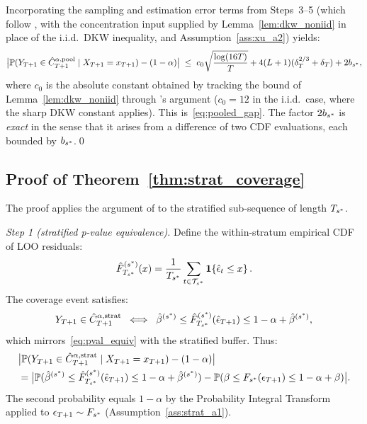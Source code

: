 Incorporating the sampling and estimation error terms
from Steps~3--5 (which follow \citealt[proof of Theorem~1]{xu2023conformal},
with the concentration input supplied by
Lemma~\ref{lem:dkw_noniid} in place of the i.i.d.\ DKW
inequality, and Assumption~\ref{ass:xu_a2}) yields:
\[
  \bigl|\mathbb{P}(Y_{T+1} \in \hat{C}_{T+1}^{\alpha,\text{pool}} \mid X_{T+1}=x_{T+1}) - (1-\alpha)\bigr|
  \;\leq\;
  c_0\sqrt{\frac{\log(16T)}{T}}
  + 4(L+1)(\delta_T^{2/3}+\delta_T)
  + 2b_{s^*},
\]
where $c_0$ is the absolute constant obtained by tracking the
bound of Lemma~\ref{lem:dkw_noniid} through
\citeauthor{xu2023conformal}'s argument ($c_0 = 12$ in the
i.i.d.\ case, where the sharp DKW constant applies).  This
is~\eqref{eq:pooled_gap}. The factor $2b_{s^*}$ is
\emph{exact} in the sense that it arises from a difference of two
CDF evaluations, each bounded by $b_{s^*}$.\qed

\subsection{Proof of Theorem~\ref{thm:strat_coverage}}
\label{app:proofs:thm1s}

The proof applies the argument of
\citet[Theorem~1]{xu2023conformal} to the stratified
sub-sequence of length $T_{s^*}$.

\medskip
\noindent\textit{Step 1 (stratified p-value equivalence).}
Define the within-stratum empirical CDF of LOO residuals:
\[
  \hat{F}_{T_{s^*}}^{(s^*)}(x)
  = \frac{1}{T_{s^*}}\sum_{t \in \mathcal{T}_{s^*}} \mathbf{1}\!\left\{\hat{\epsilon}_t \leq x\right\}.
\]
The coverage event satisfies:
\[
  Y_{T+1} \in \hat{C}_{T+1}^{\alpha,\text{strat}}
  \;\iff\;
  \hat{\beta}^{(s^*)} \leq
  \hat{F}_{T_{s^*}}^{(s^*)}(\hat{\epsilon}_{T+1})
  \leq 1-\alpha+\hat{\beta}^{(s^*)},
\]
which mirrors~\eqref{eq:pval_equiv} with the stratified buffer.
Thus:
\begin{align}
  \label{eq:strat_gap_start}
  &\bigl|\mathbb{P}(Y_{T+1} \in \hat{C}_{T+1}^{\alpha,\text{strat}} \mid X_{T+1}=x_{T+1}) - (1-\alpha)\bigr|
  \notag\\
  &= \bigl|\mathbb{P}(\hat{\beta}^{(s^*)} \leq
    \hat{F}_{T_{s^*}}^{(s^*)}(\hat{\epsilon}_{T+1})
    \leq 1-\alpha+\hat{\beta}^{(s^*)})
     - \mathbb{P}(\beta \leq F_{s^*}(\epsilon_{T+1}) \leq 1-\alpha+\beta)\bigr|.
\end{align}
The second probability equals $1-\alpha$ by the Probability
Integral Transform applied to $\epsilon_{T+1} \sim F_{s^*}$
(Assumption~\ref{ass:strat_a1}).

